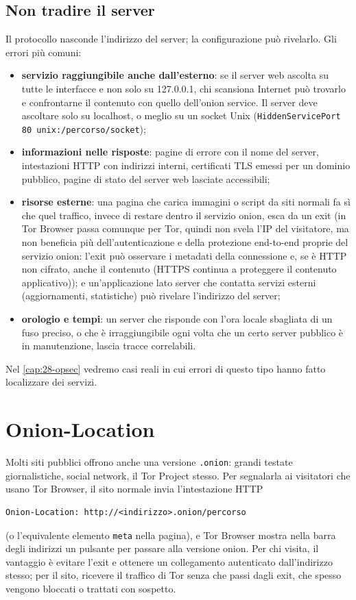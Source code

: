 \subsection{Non tradire il server}

Il protocollo nasconde l'indirizzo del server; la configurazione può rivelarlo. Gli errori più comuni:
\begin{itemize}
  \item \textbf{servizio raggiungibile anche dall'esterno}: se il server web ascolta su tutte le interfacce e non solo su 127.0.0.1, chi scansiona Internet può trovarlo e confrontarne il contenuto con quello dell'onion service. Il server deve ascoltare solo su localhost, o meglio su un socket Unix (\texttt{HiddenServicePort 80 unix:/percorso/socket});
  \item \textbf{informazioni nelle risposte}: pagine di errore con il nome del server, intestazioni HTTP con indirizzi interni, certificati TLS emessi per un dominio pubblico, pagine di stato del server web lasciate accessibili;
  \item \textbf{risorse esterne}: una pagina che carica immagini o script da siti normali fa sì che quel traffico, invece di restare dentro il servizio onion, esca da un exit (in Tor Browser passa comunque per Tor, quindi non svela l'IP del visitatore, ma non beneficia più dell'autenticazione e della protezione end-to-end proprie del servizio onion: l'exit può osservare i metadati della connessione e, se è HTTP non cifrato, anche il contenuto (HTTPS continua a proteggere il contenuto applicativo)); e un'applicazione lato server che contatta servizi esterni (aggiornamenti, statistiche) può rivelare l'indirizzo del server;
  \item \textbf{orologio e tempi}: un server che risponde con l'ora locale sbagliata di un fuso preciso, o che è irraggiungibile ogni volta che un certo server pubblico è in manutenzione, lascia tracce correlabili.
\end{itemize}
Nel \cref{cap:28-opsec} vedremo casi reali in cui errori di questo tipo hanno fatto localizzare dei servizi.

\section{Onion-Location}\label{sec:onionp-location}

Molti siti pubblici offrono anche una versione \texttt{.onion}: grandi testate giornalistiche, social network, il Tor Project stesso. Per segnalarla ai visitatori che usano Tor Browser, il sito normale invia l'intestazione HTTP
\begin{lstlisting}[numbers=none]
Onion-Location: http://<indirizzo>.onion/percorso
\end{lstlisting}
(o l'equivalente elemento \texttt{meta} nella pagina), e Tor Browser mostra nella barra degli indirizzi un pulsante per passare alla versione onion. Per chi visita, il vantaggio è evitare l'exit e ottenere un collegamento autenticato dall'indirizzo stesso; per il sito, ricevere il traffico di Tor senza che passi dagli exit, che spesso vengono bloccati o trattati con sospetto.

